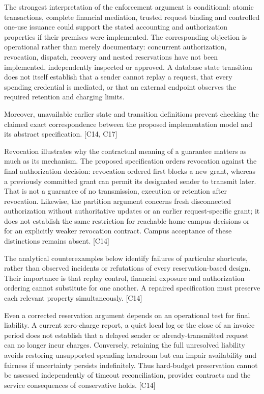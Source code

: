 \documentclass[11pt]{article}
\begin{document}
The strongest interpretation of the enforcement argument is conditional: atomic transactions, complete financial mediation, trusted request binding and controlled one-use issuance could support the stated accounting and authorization properties if their premises were implemented. The corresponding objection is operational rather than merely documentary: concurrent authorization, revocation, dispatch, recovery and nested reservations have not been implemented, independently inspected or approved. A database state transition does not itself establish that a sender cannot replay a request, that every spending credential is mediated, or that an external endpoint observes the required retention and charging limits.

Moreover, unavailable earlier state and transition definitions prevent checking the claimed exact correspondence between the proposed implementation model and its abstract specification. [C14, C17]

Revocation illustrates why the contractual meaning of a guarantee matters as much as its mechanism. The proposed specification orders revocation against the final authorization decision: revocation ordered first blocks a new grant, whereas a previously committed grant can permit its designated sender to transmit later. That is not a guarantee of no transmission, execution or retention after revocation. Likewise, the partition argument concerns fresh disconnected authorization without authoritative updates or an earlier request-specific grant; it does not establish the same restriction for reachable home-campus decisions or for an explicitly weaker revocation contract. Campus acceptance of these distinctions remains absent. [C14]

The analytical counterexamples below identify failures of particular shortcuts, rather than observed incidents or refutations of every reservation-based design. Their importance is that replay control, financial exposure and authorization ordering cannot substitute for one another. A repaired specification must preserve each relevant property simultaneously. [C14]

Even a corrected reservation argument depends on an operational test for final liability. A current zero-charge report, a quiet local log or the close of an invoice period does not establish that a delayed sender or already-transmitted request can no longer incur charges. Conversely, retaining the full unresolved liability avoids restoring unsupported spending headroom but can impair availability and fairness if uncertainty persists indefinitely. Thus hard-budget preservation cannot be assessed independently of timeout reconciliation, provider contracts and the service consequences of conservative holds. [C14]
\end{document}
